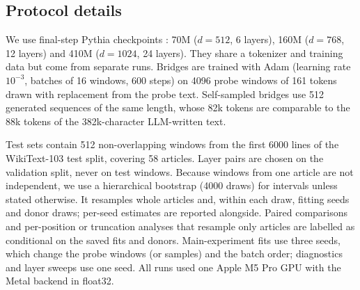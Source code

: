 \subsection{Protocol details}
We use final-step Pythia checkpoints \citep{biderman2023pythia}: 70M ($d=512$, 6 layers), 160M ($d=768$, 12 layers) and 410M ($d=1024$, 24 layers). They share a tokenizer and training data but come from separate runs. Bridges are trained with Adam (learning rate $10^{-3}$, batches of 16 windows, 600 steps) on 4096 probe windows of 161 tokens drawn with replacement from the probe text. Self-sampled bridges use 512 generated sequences of the same length, whose 82k tokens are comparable to the 88k tokens of the 382k-character LLM-written text.

Test sets contain 512 non-overlapping windows from the first 6000 lines of the WikiText-103 test split, covering 58 articles. Layer pairs are chosen on the validation split, never on test windows. Because windows from one article are not independent, we use a hierarchical bootstrap (4000 draws) for intervals unless stated otherwise. It resamples whole articles and, within each draw, fitting seeds and donor draws; per-seed estimates are reported alongside. Paired comparisons and per-position or truncation analyses that resample only articles are labelled as conditional on the saved fits and donors. Main-experiment fits use three seeds, which change the probe windows (or samples) and the batch order; diagnostics and layer sweeps use one seed. All runs used one Apple M5 Pro GPU with the Metal backend in float32.
